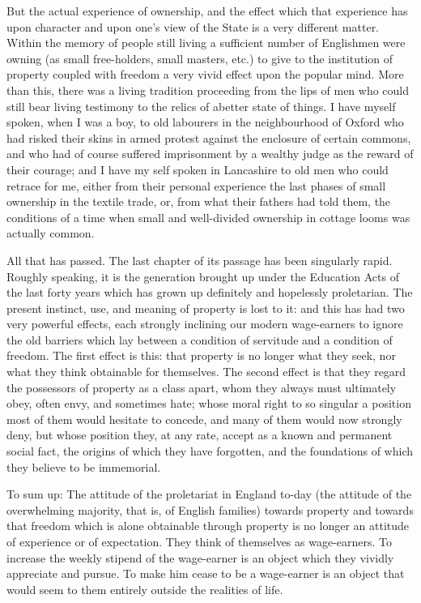 \documentclass{book}
\begin{document}
But the actual experience of ownership, and the effect which that experience has upon character and upon one’s view of the State is a very different matter. Within the memory of people still living a sufficient number of Englishmen were owning (as small free-holders, small masters, etc.) to give to the institution of property coupled with freedom a very vivid effect upon the popular mind. More than this, there was a living tradition proceeding from the lips of men who could still bear living testimony to the relics of abetter state of things. I have myself spoken, when I was a boy, to old labourers in the neighbourhood of Oxford who had risked their skins in armed protest against the enclosure of certain commons, and who had of course suffered imprisonment by a wealthy judge as the reward of their courage; and I have my self spoken in Lancashire to old men who could retrace for me, either from their personal experience the last phases of small ownership in the textile trade, or, from what their fathers had told them, the conditions of a time when small and well-divided ownership in cottage looms was actually common.

All that has passed. The last chapter of its passage has been singularly rapid. Roughly speaking, it is the generation brought up under the Education Acts of the last forty years which has grown up definitely and hopelessly proletarian. The present instinct, use, and meaning of property is lost to it: and this has had two very powerful effects, each strongly inclining our modern wage-earners to ignore the old barriers which lay between a condition of servitude and a condition of freedom. The first effect is this: that property is no longer what they seek, nor what they think obtainable for themselves. The second effect is that they regard the possessors of property as a class apart, whom they always must ultimately obey, often envy, and sometimes hate; whose moral right to so singular a position most of them would hesitate to concede, and many of them would now strongly deny, but whose position they, at any rate, accept as a known and permanent social fact, the origins of which they have forgotten, and the foundations of which they believe to be immemorial.

To sum up: The attitude of the proletariat in England to-day (the attitude of the overwhelming majority, that is, of English families) towards property and towards that freedom which is alone obtainable through property is no longer an attitude of experience or of expectation. They think of themselves as wage-earners. To increase the weekly stipend of the wage-earner is an object which they vividly appreciate and pursue. To make him cease to be a wage-earner is an object that would seem to them entirely outside the realities of life.
\end{document}

